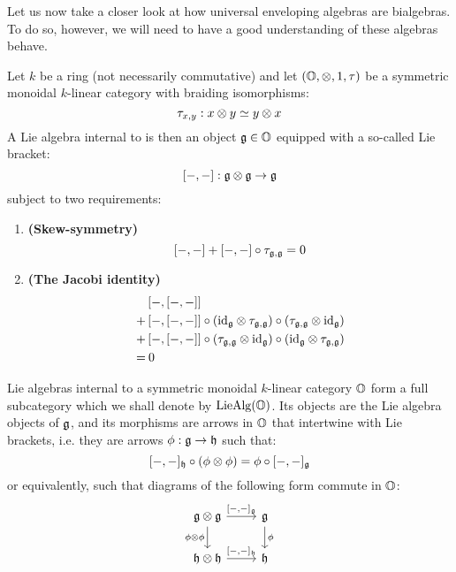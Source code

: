             Let us now take a closer look at how universal enveloping algebras are bialgebras. To do so, however, we will need to have a good understanding of these algebras behave. 
            \begin{definition} \label{def: lie_algebras}
                Let $k$ be a ring (not necessarily commutative) and let $(\O, \tensor, 1, \tau)$ be a symmetric monoidal $k$-linear category with braiding isomorphisms:
                    $$\tau_{x, y}: x \tensor y \cong y \tensor x$$
                A Lie algebra internal to is then an object $\mathfrak{g} \in \mathbb{O}$ equipped with a so-called Lie bracket:
                    $$[-,-]: \g \tensor \g \to \g$$
                subject to two requirements:
                    \begin{enumerate}
                        \item \textbf{(Skew-symmetry)}
                            $$[-,-] + [-,-] \circ \tau_{\mathfrak{g}, \mathfrak{g}} = 0$$
                        \item \textbf{(The Jacobi identity)}
                            $$
                                \begin{aligned}
                                    & \left[-, [-,-]\right]
                                    \\
                                    + & \left[-, [-,-]\right] \circ \left(\id_{\g} \tensor \tau_{\g, \g}\right) \circ \left(\tau_{\g, \g} \tensor \id_{\g}\right)
                                    \\
                                    + & \left[-, [-,-]\right] \circ \left(\tau_{\g, \g} \tensor \id_{\g}\right) \circ \left(\id_{\g} \tensor \tau_{\g, \g}\right)
                                    \\
                                    = & \: 0
                                \end{aligned}
                            $$
                    \end{enumerate}
                Lie algebras internal to a symmetric monoidal $k$-linear category $\mathbb{O}$ form a full subcategory which we shall denote by $\mathrm{Lie}\mathrm{Alg}(\mathbb{O})$. Its objects are the Lie algebra objects of $\mathfrak{g}$, and its morphisms are arrows in $\mathbb{O}$ that intertwine with Lie brackets, i.e. they are arrows $\phi: \mathfrak{g} \to \mathfrak{h}$ such that:
                    $$[-,-]_{\h} \circ (\phi \tensor \phi) = \phi \circ [-,-]_{\g}$$
                or equivalently, such that diagrams of the following form commute in $\mathbb{O}$:
                    $$
                        \begin{tikzcd}
                        	{\g \tensor \g} & {\g} \\
                        	{\h \tensor \h} & {\h}
                        	\arrow["{\phi}", from=1-2, to=2-2]
                        	\arrow["{\phi \tensor \phi}"', from=1-1, to=2-1]
                        	\arrow["{[-,-]_{\h}}", from=2-1, to=2-2]
                        	\arrow["{[-,-]_{\g}}", from=1-1, to=1-2]
                        \end{tikzcd}
                    $$
            \end{definition}
            

